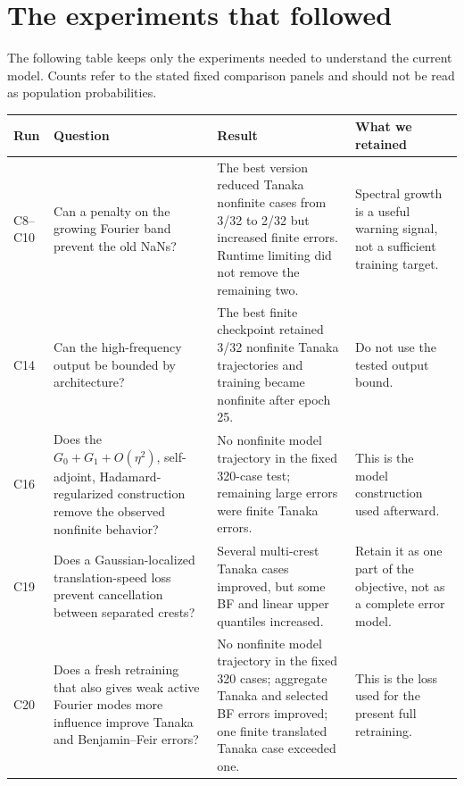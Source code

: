 \documentclass[11pt]{article}
\begin{document}
\FloatBarrier

\section{The experiments that followed}

The following table keeps only the experiments needed to understand the
current model.  Counts refer to the stated fixed comparison panels and should
not be read as population probabilities.

\begin{table}[htbp]
\centering
\small
\begin{tabularx}{\textwidth}{p{}p{}X p{}}
\toprule
Run & Question & Result & What we retained \\
\midrule
C8--C10
& Can a penalty on the growing Fourier band prevent the old NaNs?
& The best version reduced Tanaka nonfinite cases from 3/32 to 2/32 but
increased finite errors.  Runtime limiting did not remove the remaining two.
& Spectral growth is a useful warning signal, not a sufficient training target. \\

C14
& Can the high-frequency output be bounded by architecture?
& The best finite checkpoint retained 3/32 nonfinite Tanaka trajectories and
training became nonfinite after epoch 25.
& Do not use the tested output bound. \\

C16
& Does the $G_0+G_1+O(\eta^2)$, self-adjoint, Hadamard-regularized construction
remove the observed nonfinite behavior?
& No nonfinite model trajectory in the fixed 320-case test; remaining large
errors were finite Tanaka errors.
& This is the model construction used afterward. \\

C19
& Does a Gaussian-localized translation-speed loss prevent cancellation
between separated crests?
& Several multi-crest Tanaka cases improved, but some BF and linear upper
quantiles increased.
& Retain it as one part of the objective, not as a complete error model. \\

C20
& Does a fresh retraining that also gives weak active Fourier modes more
influence improve Tanaka and Benjamin--Feir errors?
& No nonfinite model trajectory in the fixed 320 cases; aggregate Tanaka and
selected BF errors improved; one finite translated Tanaka case exceeded one.
& This is the loss used for the present full retraining. \\


\end{tabularx}
\end{table}
\end{document}
